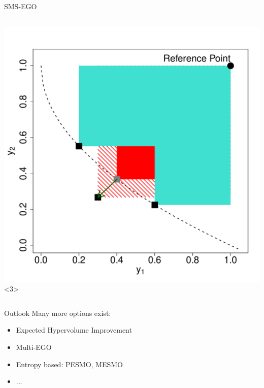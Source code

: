 \documentclass[11pt,compress,t,notes=noshow, xcolor=table]{beamer}
\begin{document}
\begin{frame}{SMS-EGO}
\begin{columns}
\begin{column}{0.45\textwidth}
\includegraphics[page = 1]{figure_man/sms_plot.pdf}<3>

\end{column}

\end{columns}
\end{frame}

\begin{frame}{Outlook}
Many more options exist:
\begin{itemize}
  \item Expected Hypervolume Improvement
  \item Multi-EGO
  \item Entropy based: PESMO, MESMO
  \item ...
\end{itemize}

\end{frame}


\endlecture
\end{document}
